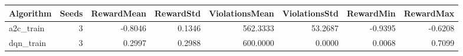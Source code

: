 \begin{tabular}{lrrrrrrr}
\toprule
Algorithm & Seeds & RewardMean & RewardStd & ViolationsMean & ViolationsStd & RewardMin & RewardMax \\
\midrule
a2c_train & 3 & -0.8046 & 0.1346 & 562.3333 & 53.2687 & -0.9395 & -0.6208 \\
dqn_train & 3 & 0.2997 & 0.2988 & 600.0000 & 0.0000 & 0.0068 & 0.7099 \\
\bottomrule
\end{tabular}
